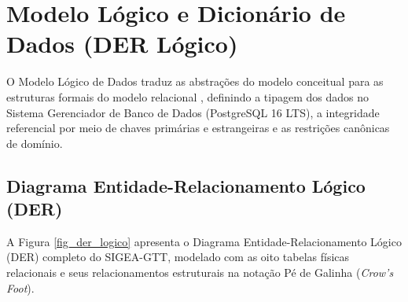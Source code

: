 \chapter{Modelo Lógico e Dicionário de Dados (DER Lógico)}
\label{cap_modelo_logico}

O Modelo Lógico de Dados traduz as abstrações do modelo conceitual para as estruturas formais do modelo relacional \cite{codd1970, martin1989}, definindo a tipagem dos dados no Sistema Gerenciador de Banco de Dados (PostgreSQL 16 LTS), a integridade referencial por meio de chaves primárias e estrangeiras e as restrições canônicas de domínio.

\section{Diagrama Entidade-Relacionamento Lógico (DER)}
\label{sec_diagrama_der_logico}

A Figura \ref{fig_der_logico} apresenta o Diagrama Entidade-Relacionamento Lógico (DER) completo do SIGEA-GTT, modelado com as oito tabelas físicas relacionais e seus relacionamentos estruturais na notação Pé de Galinha (\textit{Crow's Foot}).

